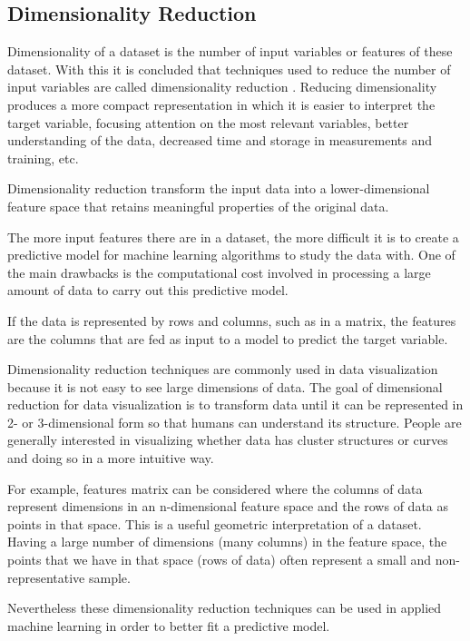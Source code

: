 \subsection{Dimensionality Reduction}
\label{sec:dimensionality-reduction-1}

Dimensionality of a dataset is the number of input variables or features of these dataset. With this it is concluded that techniques used to reduce the number of input variables are called dimensionality reduction \cite{dimensionality-reduction}. Reducing dimensionality produces a more compact representation in which it is easier to interpret the target variable, focusing attention on the most relevant variables, better understanding of the data, decreased time and storage in measurements and training, etc.

Dimensionality reduction transform the input data into a lower-dimensional feature space that retains meaningful properties of the original data.

The more input features there are in a dataset, the more difficult it is to create a predictive model for machine learning algorithms to study the data with. One of the main drawbacks is the computational cost involved in processing a large amount of data to carry out this predictive model.

If the data is represented by rows and columns, such as in a matrix, the features are the columns that are fed as input to a model to predict the target variable.

Dimensionality reduction techniques are commonly used in data visualization because it is not easy to see large dimensions of data. The goal of dimensional reduction for data visualization is to transform data until it can be represented in 2- or 3-dimensional form so that humans can understand its structure. People are generally interested in visualizing whether data has cluster structures or curves and doing so in a more intuitive way.

For example, features matrix can be considered where the columns of data represent dimensions in an n-dimensional feature space and the rows of data as points in that space. This is a useful geometric interpretation of a dataset. Having a large number of dimensions (many columns) in the feature space, the points that we have in that space (rows of data) often represent a small and non-representative sample.

Nevertheless these dimensionality reduction techniques can be used in applied machine learning in order to better fit a predictive model.

